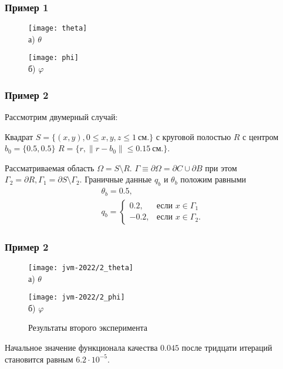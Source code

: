 \begin{frame}
    \frametitle{Пример 1}
      \begin{figure}[h!t]
        \begin{minipage}[b][][b]{0.49\linewidth}
            \centering
            \texttt{[image: theta]}
            \\ а) $\theta$
        \end{minipage}
        \hfill
        \begin{minipage}[b][][b]{0.49\linewidth}
            \centering
            \texttt{[image: phi]}
            \\ б) $\varphi$
        \end{minipage}
        \label{fig:4_4:5}
    \end{figure}
\end{frame}
\begin{frame}
    \frametitle{Пример 2}
    Рассмотрим двумерный случай:

    Квадрат $S = \{(x, y), 0 \leq x,y,z \leq 1~\text{см.}\}$ с
    круговой полостью $R$ с центром $b_0 =\{0.5, 0.5\}$
    $R = \{r, \| r - b_0 \| \leq 0.15~\text{см.} \}$.

    Рассматриваемая область $\Omega = S \setminus R$.
    $\Gamma \equiv \partial \Omega = \partial C \cup \partial B$ при этом
    $ \Gamma_2 = \partial R, \Gamma_1 = \partial S \setminus \Gamma_2$.
    Граничные данные $q_b$ и $\theta_b$ положим равными
    \begin{gather*}
        \theta_b = 0.5, \\
        q_b =
        \begin{cases}
            0.2, & \text{если } x \in \Gamma_1 \\
            -0.2, & \text{если } x \in \Gamma_2.
        \end{cases}
    \end{gather*}


\end{frame}

\begin{frame}
    \frametitle{Пример 2}
    \begin{figure}[h!t]
        \begin{minipage}[b][][b]{0.49\linewidth}
            \centering
            \texttt{[image: jvm-2022/2\_theta]}
            \\ а) $\theta$
        \end{minipage}
        \hfill
        \begin{minipage}[b][][b]{0.49\linewidth}
            \centering
            \texttt{[image: jvm-2022/2\_phi]}
            \\ б) $\varphi$
        \end{minipage}
        \caption{Результаты второго эксперимента}
        \label{fig:4_4:6}
    \end{figure}
    Начальное значение функционала качества $0.045$
    после тридцати итераций становится равным $6.2\cdot10^{-5}$.

\end{frame}

